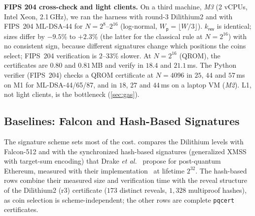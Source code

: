\documentclass[10pt,journal,compsoc]{IEEEtran}
\theoremstyle{tplain}
\theoremstyle{tdef}
\theoremstyle{remark}
\newcommand{\Wp}{W_{\mathsf{p}}}
\newcommand{\kr}{k_{\mathsf{rev}}}
\begin{document}
\noindent\textbf{FIPS 204 cross-check and light clients.} On a third machine, \emph{M3} (2 vCPUs, Intel Xeon, 2.1\,GHz), we ran the harness with round-3 Dilithium2 and with FIPS~204 ML-DSA-44 for $N=2^8$--$2^{16}$ (log-normal, $\Wp=\lfloor W/3\rfloor$). $\kr$ is identical; sizes differ by $-9.5\%$ to $+2.3\%$ (the latter for the classical rule at $N=2^{16}$) with no consistent sign, because different signatures change which positions the coins select; FIPS~204 verification is $2$--$33\%$ slower. At $N=2^{16}$ (QROM), the certificates are $0.80$ and $0.81$\,MB and verify in $18.4$ and $21.1$\,ms. The Python verifier (FIPS~204) checks a QROM certificate at $N=4096$ in $25$, $44$ and $57$\,ms on M1 for ML-DSA-44/65/87, and in $18$, $27$ and $44$\,ms on a laptop VM (\emph{M2}). L1, not light clients, is the bottleneck (\cref{sec:gas}).

\subsection{Baselines: Falcon and Hash-Based Signatures}\label{sec:baselines}
The signature scheme sets most of the cost.  compares the Dilithium levels with Falcon-512 and with the synchronized hash-based signatures (generalized XMSS with target-sum encoding) that Drake \emph{et al.}~\cite{drake2025hashsig} propose for post-quantum Ethereum, measured with their implementation~\cite{hashsig_impl} at lifetime $2^{32}$. The hash-based rows combine their measured size and verification time with the reveal structure of the Dilithium2 (r3) certificate ($173$ distinct reveals, $1{,}328$ multiproof hashes), as coin selection is scheme-independent; the other rows are complete \texttt{pqcert} certificates.

\begin{table}[t]
\centering
\caption{Signature-scheme baselines on M1 ($N=4096$, log-normal, QROM, $3{,}524$ signers). ``All sigs'': size of shipping every signature and key. Rows marked (r3) use round-3 Dilithium (\cref{sec:eval}). $^\ast$Composed from measured components (see text).}
\label{tab:base}
\scriptsize
\setlength{\tabcolsep}{2.4pt}
\end{table}
\end{document}
